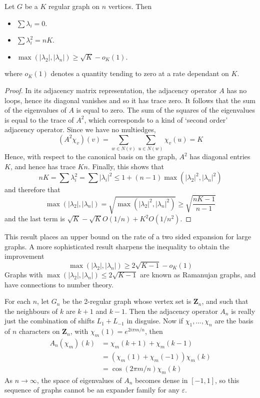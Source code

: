 \begin{theorem}
    Let $G$ be a $K$ regular graph on $n$ vertices. Then
    \begin{itemize}
        \item $\sum \lambda_i = 0$.
        \item $\sum \lambda_i^2 = nK$.
        \item $\max(|\lambda_2|,|\lambda_n|) \geq \sqrt{K} - o_K(1)$.
    \end{itemize}
    where $o_K(1)$ denotes a quantity tending to zero at a rate dependant on $K$.
\end{theorem}
\begin{proof}
    In its adjacency matrix representation, the adjacency operator $A$ has no loops, hence its diagonal vanishes and so it has trace zero. It follows that the sum of the eigenvalues of $A$ is equal to zero. The sum of the squares of the eigenvalues is equal to the trace of $A^2$, which corresponds to a kind of `second order' adjacency operator. Since we have no multiedges,
    \[ (A^2 \chi_v)(v) = \sum_{w \in N(v)} \sum_{u \in N(w)} \chi_v(u) = K \]
    Hence, with respect to the canonical basis on the graph, $A^2$ has diagonal entries $K$, and hence has trace $Kn$. Finally, this shows that
    \[ nK = \sum \lambda_i^2 = \sum |\lambda_i|^2 \leq 1 + (n-1) \max(|\lambda_2|^2, |\lambda_n|^2) \]
    and therefore that
    \[ \max(|\lambda_2|,|\lambda_n|) = \sqrt{\max(|\lambda_2|^2, |\lambda_n|^2)} \geq \sqrt{\frac{nK - 1}{n-1}} \]
    and the last term is $\sqrt{K} - \sqrt{K} O(1/n) + K^2 O(1/n^2)$.
\end{proof}

This result places an upper bound on the rate of a two sided expansion for large graphs. A more sophisticated result sharpens the inequality to obtain the improvement
%
\[ \max(|\lambda_2|, |\lambda_n|) \geq 2\sqrt{K-1} - o_K(1) \]
%
Graphs with $\max(|\lambda_2|,|\lambda_n|) \leq 2 \sqrt{K-1}$ are known as Ramanujan graphs, and have connections to number theory.

\begin{example}
    For each $n$, let $G_n$ be the 2-regular graph whose vertex set is $\mathbf{Z}_n$, and such that the neighbours of $k$ are $k+1$ and $k-1$. Then the adjacency operator $A_n$ is really just the combination of shifts $L_1 + L_{-1}$ in disguise. Now if $\chi_1, \dots, \chi_n$ are the basis of $n$ characters on $\mathbf{Z}_n$, with $\chi_m(1) = e^{2 i \pi m/n}$, then
    \begin{align*}
        A_n(\chi_m)(k) &= \chi_m(k+1) + \chi_m(k-1)\\
        &= (\chi_m(1) + \chi_m(-1)) \chi_m(k)\\
        &= \cos(2 \pi m/n) \chi_m(k)
    \end{align*}
    As $n \to \infty$, the space of eigenvalues of $A_n$ becomes dense in $[-1,1]$, so this sequence of graphs cannot be an expander family for any $\varepsilon$.
\end{example}


